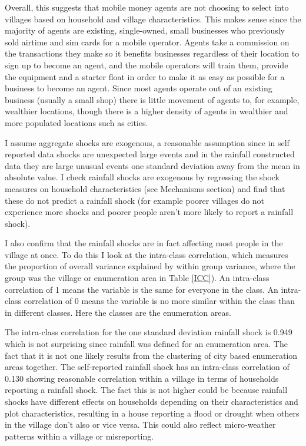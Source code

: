 Overall, this suggests that mobile money agents are not choosing to select into villages based on household and village characteristics. This makes sense since the majority of agents are existing, single-owned, small businesses who previously sold airtime and sim cards for a mobile operator. Agents take a commission on the transactions they make so it benefits businesses regardless of their location to sign up to become an agent, and the mobile operators will train them, provide the equipment and a starter float in order to make it as easy as possible for a business to become an agent. Since most agents operate out of an existing business (usually a small shop) there is little movement of agents to, for example, wealthier locations, though there is a higher density of agents in wealthier and more populated locations such as cities. 


I assume aggregate shocks are exogenous, a reasonable assumption since in self reported data shocks are unexpected large events and in the rainfall constructed data they are large unusual events one standard deviation away from the mean in absolute value. I check rainfall shocks are exogenous by regressing the shock measures on household characteristics (see Mechanisms section) and find that these do not predict a rainfall shock (for example poorer villages do not experience more shocks and poorer people aren't more likely to report a rainfall shock).  

I also confirm that the rainfall shocks are in fact affecting most people in the village at once. To do this I look at the intra-class correlation, which measures the proportion of overall variance explained by within group variance, where the group was the village or enumeration area in Table \ref{ICC}). An intra-class correlation of 1 means the variable is the same for everyone in the class. An intra-class correlation of 0 means the variable is no more similar within the class than in different classes. Here the classes are the enumeration areas. 


The intra-class correlation for the one standard deviation rainfall shock is 0.949 which is not surprising since rainfall was defined for an enumeration area. The fact that it is not one likely results from the clustering of city based enumeration areas together. The self-reported rainfall shock has an intra-class correlation of 0.130 showing reasonable correlation within a village in terms of households reporting a rainfall shock. The fact this is not higher could be because rainfall shocks have different effects on households depending on their characteristics and plot characteristics, resulting in a house reporting a flood or drought when others in the village don't also or vice versa. This could also reflect micro-weather patterns within a village or misreporting.   
